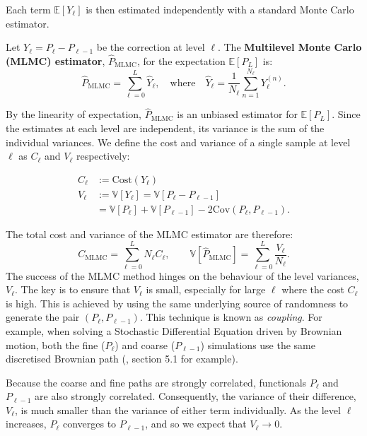 Each term $\mathbb{E}[Y_\ell]$ is then estimated independently with a standard Monte Carlo estimator.

\begin{definition}\label{def:mlmc_estimator}
    Let $Y_\ell = P_\ell - P_{\ell-1}$ be the correction at level $\ell$. The \textbf{Multilevel Monte Carlo (MLMC) estimator}, $\hat{P}_{\mathrm{MLMC}}$, for the expectation $\mathbb{E}[P_L]$ is:
    \[
    \hat{P}_{\mathrm{MLMC}} = \sum_{\ell=0}^L \hat{Y}_\ell, \quad \text{where} \quad \hat{Y}_\ell = \frac{1}{N_\ell} \sum_{n=1}^{N_\ell} Y_\ell^{(n)}.
    \]
\end{definition}


By the linearity of expectation, $\hat{P}_{\mathrm{MLMC}}$ is an unbiased estimator for 
$\mathbb{E}[P_L]$. Since the estimates at each level are independent, its variance is the sum 
of the individual variances. We define the cost and variance of a single sample at 
level $\ell$ as $C_\ell$ and $V_\ell$ respectively:

\begin{align*}
    C_\ell &:= \text{Cost}(Y_\ell) \\
    V_\ell &:= \mathbb{V}[Y_\ell] = \mathbb{V}[P_\ell - P_{\ell-1}] \\
    &= \mathbb{V}[P_\ell] + \mathbb{V}[P_{\ell - 1}]  - 2 \mathrm{Cov}(P_\ell, P_{\ell - 1}).
\end{align*}

The total cost and variance of the MLMC estimator are therefore:
$$
C_{\mathrm{MLMC}} = \sum_{\ell=0}^L N_\ell C_\ell, \qquad 
\mathbb{V}[\hat{P}_{\mathrm{MLMC}}] = \sum_{\ell=0}^L \frac{V_\ell}{N_\ell}.
$$
The success of the MLMC method hinges on the behaviour of the level variances, 
$V_\ell$. The key is to ensure that $V_\ell$ is small, especially for large $\ell$ where
the cost $C_\ell$ is high. This is achieved by using the same underlying source of 
randomness to generate the pair $(P_\ell, P_{\ell-1})$. This technique is known as
\textit{coupling}. For example, when solving a Stochastic Differential Equation 
driven by Brownian motion,
both the fine ($P_\ell$) and coarse ($P_{\ell - 1}$) simulations use the same discretised Brownian path 
(\cite{giles2015multilevel}, section 5.1 for example). 

Because the coarse and fine paths are strongly correlated, 
functionals $P_\ell$ and $P_{\ell-1}$ are also strongly correlated. 
Consequently, the variance of their difference, $V_\ell$, is much smaller 
than the variance of either term individually. As the level $\ell$ increases, 
$P_\ell$ converges to $P_{\ell-1}$, and so we expect that $V_\ell \to 0$.

